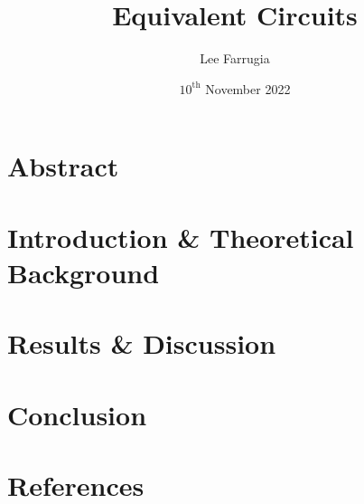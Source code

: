 \documentclass[12pt, a4paper]{article}
\title{Equivalent Circuits}
\date{\(10^\mathrm{{th}}\) November 2022}
\author{Lee Farrugia}
\begin{document}
\maketitle
\thispagestyle{titlepagestyle}
\pagestyle{mystyle}

\section*{Abstract}

\section{Introduction \& Theoretical Background}

\section{Results \& Discussion}

\section{Conclusion}

\section{References}
\end{document}
